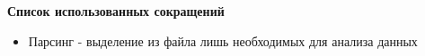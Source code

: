 \newpage
\begin{center}
  \textbf{\large Список использованных сокращений}
\end{center}

\begin{itemize}
    \item Парсинг - выделение из файла лишь необходимых для анализа данных
\end{itemize}
